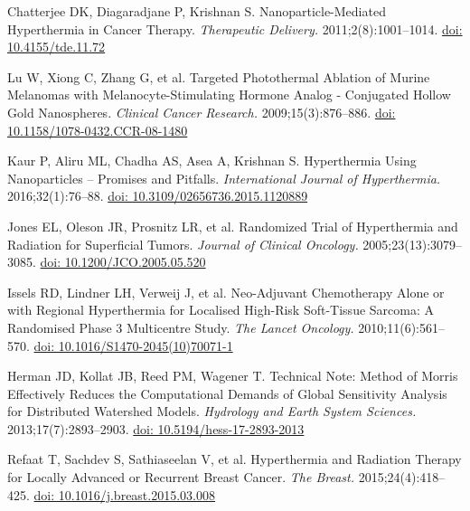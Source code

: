 \documentclass[Times1COL,AMA]{WileyNJDv5} %
\begin{document}
\begin{thebibliography}{10}
    \providecommand \doibase [0]{http://dx.doi.org/}%

    Chatterjee DK, Diagaradjane P, Krishnan S. Nanoparticle-Mediated Hyperthermia
    in Cancer Therapy. {\it Therapeutic Delivery.}
    2011\string;2(8)\string:1001--1014.
    \newblock \href {\doibase 10.4155/tde.11.72} {doi: 10.4155/tde.11.72}

    Lu W, Xiong C, Zhang G, et al. Targeted Photothermal Ablation of Murine
    Melanomas with Melanocyte-Stimulating Hormone Analog - Conjugated Hollow Gold
    Nanospheres. {\it Clinical Cancer Research.}
    2009\string;15(3)\string:876--886.
    \newblock \href {\doibase 10.1158/1078-0432.CCR-08-1480} {doi:
        10.1158/1078-0432.CCR-08-1480}

    Kaur P, Aliru ML, Chadha AS, Asea A, Krishnan S. Hyperthermia Using
    Nanoparticles -- {{Promises}} and Pitfalls. {\it International Journal of
            Hyperthermia.} 2016\string;32(1)\string:76--88.
    \newblock \href {\doibase 10.3109/02656736.2015.1120889} {doi:
        10.3109/02656736.2015.1120889}

    Jones EL, Oleson JR, Prosnitz LR, et al. Randomized {{Trial}} of
        {{Hyperthermia}} and {{Radiation}} for {{Superficial Tumors}}. {\it Journal
    of Clinical Oncology.} 2005\string;23(13)\string:3079--3085.
    \newblock \href {\doibase 10.1200/JCO.2005.05.520} {doi:
        10.1200/JCO.2005.05.520}

    Issels RD, Lindner LH, Verweij J, et al. Neo-Adjuvant Chemotherapy Alone or
    with Regional Hyperthermia for Localised High-Risk Soft-Tissue Sarcoma: A
    Randomised Phase 3 Multicentre Study. {\it The Lancet Oncology.}
    2010\string;11(6)\string:561--570.
    \newblock \href {\doibase 10.1016/S1470-2045(10)70071-1} {doi:
        10.1016/S1470-2045(10)70071-1}

    Herman JD, Kollat JB, Reed PM, Wagener T. Technical {{Note}}: {{Method}} of
        {{Morris}} Effectively Reduces the Computational Demands of Global
    Sensitivity Analysis for Distributed Watershed Models. {\it Hydrology and
            Earth System Sciences.} 2013\string;17(7)\string:2893--2903.
    \newblock \href {\doibase 10.5194/hess-17-2893-2013} {doi:
        10.5194/hess-17-2893-2013}

    Refaat T, Sachdev S, Sathiaseelan V, et al. Hyperthermia and Radiation Therapy
    for Locally Advanced or Recurrent Breast Cancer. {\it The Breast.}
    2015\string;24(4)\string:418--425.
    \newblock \href {\doibase 10.1016/j.breast.2015.03.008} {doi:
        10.1016/j.breast.2015.03.008}


\end{thebibliography}
\end{document}
